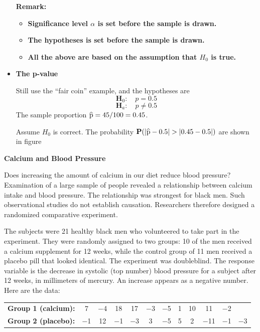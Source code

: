 \documentclass[a4paper, 12pt,twoside]{book}
\newcommand\reallywidehat[1]{%
\savestack{\tmpbox}{\stretchto{%
  \scaleto{%
    \scalerel*[\widthof{\ensuremath{#1}}]{\kern-.6pt\bigwedge\kern-.6pt}%
    {\rule[-\textheight/2]{1ex}{\textheight}}%
  }{\textheight}%
}{0.5ex}}%
\stackon[1pt]{#1}{\tmpbox}%
}
\begin{document}
\begin{itemize}
\colorbox{babypink}{\parbox{0.9\textwidth}{
\textbf{Remark:}\vspace{0.3cm}

 \begin{itemize}
     \item \textbf{Significance level $\alpha$ is set before the sample is drawn.} 
     \item \textbf{The hypotheses is set before the sample is drawn.}
     \item \textbf{All the above are based on the assumption that $H_0$ is true.}
 \end{itemize}

}}

\newpage

\item \textbf{The p-value}\vspace{0.3cm}

Still use the ``fair coin'' example, and the hypotheses are
$$\textbf{H}_0:\quad p=0.5$$
$$\textbf{H}_a:\quad p\ne0.5$$ 
The sample proportion $\reallywidehat{p} = 45/100 = 0.45$.\vspace{0.3cm}

Assume $H_0$ is correct. The probability 
$\textbf{P}(|\reallywidehat{p}-0.5| > |0.45-0.5|)$ are shown in figure



\end{itemize}






\newpage


 \colorbox{champagne}{\parbox{\textwidth}{
 \textbf{Calcium and Blood Pressure}\vspace{0.3cm}
 
 Does increasing the amount of calcium in our diet reduce blood pressure? Examination of a large sample of people revealed a relationship between calcium intake and blood pressure. The relationship was strongest for black men. Such observational studies do not establish causation. Researchers therefore designed a randomized comparative experiment.\vspace{0.3cm}
 
 The subjects were 21 healthy black men who volunteered to take part in the experiment. They were randomly assigned to two groups: 10 of the men received a calcium supplement for 12 weeks, while the control group of 11 men received a placebo pill that looked identical. The experiment was doubleblind. The response variable is the decrease in systolic (top number) blood pressure for a subject after 12 weeks, in millimeters of mercury. An increase appears as a negative number. Here are the data:
 \begin{table}[H]
 \centering
 \begin{tabular}{lcccc ccccc cc}
 \hline
 \textbf{Group 1 (calcium):}&7 &−4 &18 &17 &−3& −5 &1 &10 & 11& −2&\\
 \textbf{Group 2 (placebo):}&−1 &12 &−1 &−3 & 3 &−5& 5  &2& −11& −1 &−3\\
 \hline
 \end{tabular}
 \end{table}
 
 }}
\end{document}
